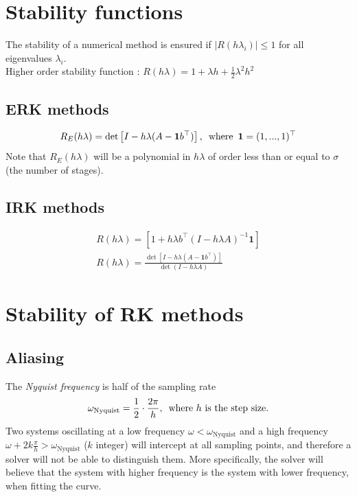 \section{Stability functions}
The stability of a numerical method is ensured if $|R(h\lambda_i)| \leq 1$ for all eigenvalues $\lambda_i$.\\
Higher order stability function : $R(h \lambda)=1+\lambda h+\frac{1}{2} \lambda^{2} h^{2}$\\
\subsection{ERK methods}
\begin{equation}
    R_E(h\lambda) = \det \left[ I - h\lambda (A - \mathbf{1} b^\top) \right], \enskip \text{where} \enskip  \mathbf{1} = (1, ... , 1)^\top
\end{equation}
Note that $R_E(h\lambda)$ will be a polynomial in $h\lambda$ of order less than or equal to $\sigma$ (the number of stages).

\subsection{IRK methods}
\begin{align}
    R(h\lambda) = \left[ 1 + h\lambda b^\top (I-h\lambda A)^{-1} \mathbf{1} \right]\\
    R(h\lambda) = \frac{\det \left[ I - h\lambda(A - \mathbf{1}b^\top) \right]}{\det(I - h\lambda A)}
\end{align}

\section{Stability of RK methods}

\subsection{Aliasing}
The \textit{Nyquist frequency} is half of the sampling rate
\begin{equation}
    \omega_{\text{Nyquist}} = \frac{1}{2} \cdot \frac{2\pi}{h}, \enskip \text{where $h$ is the step size.}
\end{equation}
Two systems oscillating at a low frequency $\omega < \omega_{\text{Nyquist}}$ and a high frequency $\omega + 2k\frac{\pi}{h} > \omega_{\text{Nyquist}}$ ($k$ integer) will intercept at all sampling points, and therefore a solver will not be able to distinguish them. More specifically, the solver will believe that the system with higher frequency is the system with lower frequency, when fitting the curve.


